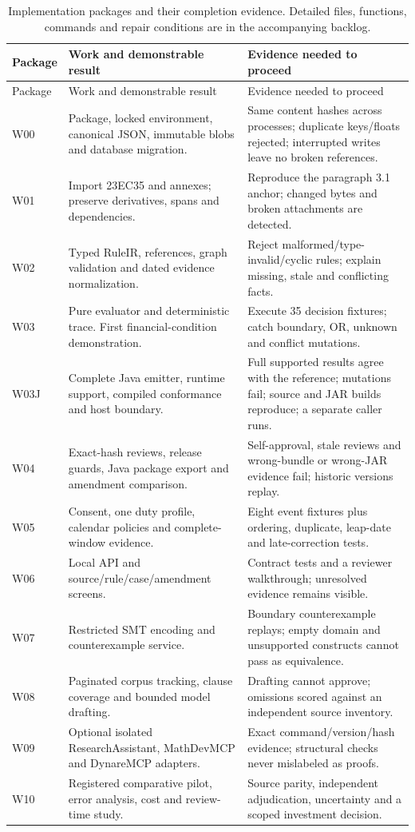 \documentclass[12pt,a4paper,oneside,openany]{book}
\begin{document}
\begingroup\small
\begin{longtable}{P{0.12\textwidth}P{0.42\textwidth}P{0.36\textwidth}}
\caption{Implementation packages and their completion evidence. Detailed files,
functions, commands and repair conditions are in the accompanying backlog.}\label{tab:phases}\\
\toprule Package & Work and demonstrable result & Evidence needed to proceed \\\midrule
\endfirsthead
\toprule Package & Work and demonstrable result & Evidence needed to proceed \\\midrule
\endhead
W00 & Package, locked environment, canonical JSON, immutable blobs and database migration. & Same content hashes across processes; duplicate keys/floats rejected; interrupted writes leave no broken references.\\
W01 & Import 23EC35 and annexes; preserve derivatives, spans and dependencies. & Reproduce the paragraph 3.1 anchor; changed bytes and broken attachments are detected.\\
W02 & Typed RuleIR, references, graph validation and dated evidence normalization. & Reject malformed/type-invalid/cyclic rules; explain missing, stale and conflicting facts.\\
W03 & Pure evaluator and deterministic trace. First financial-condition demonstration. & Execute 35 decision fixtures; catch boundary, OR, unknown and conflict mutations.\\
W03J & Complete Java emitter, runtime support, compiled conformance and host boundary. & Full supported results agree with the reference; mutations fail; source and JAR builds reproduce; a separate caller runs.\\
W04 & Exact-hash reviews, release guards, Java package export and amendment comparison. & Self-approval, stale reviews and wrong-bundle or wrong-JAR evidence fail; historic versions replay.\\
W05 & Consent, one duty profile, calendar policies and complete-window evidence. & Eight event fixtures plus ordering, duplicate, leap-date and late-correction tests.\\
W06 & Local API and source/rule/case/amendment screens. & Contract tests and a reviewer walkthrough; unresolved evidence remains visible.\\
W07 & Restricted SMT encoding and counterexample service. & Boundary counterexample replays; empty domain and unsupported constructs cannot pass as equivalence.\\
W08 & Paginated corpus tracking, clause coverage and bounded model drafting. & Drafting cannot approve; omissions scored against an independent source inventory.\\
W09 & Optional isolated ResearchAssistant, MathDevMCP and DynareMCP adapters. & Exact command/version/hash evidence; structural checks never mislabeled as proofs.\\
W10 & Registered comparative pilot, error analysis, cost and review-time study. & Source parity, independent adjudication, uncertainty and a scoped investment decision.\\
\bottomrule
\end{longtable}
\endgroup
\end{document}
